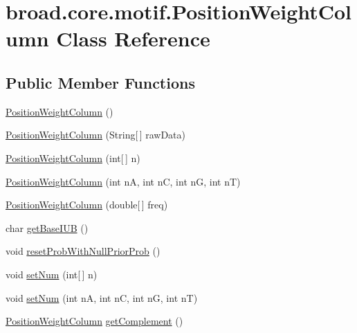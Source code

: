 \hypertarget{classbroad_1_1core_1_1motif_1_1_position_weight_column}{\section{broad.\+core.\+motif.\+Position\+Weight\+Column Class Reference}
\label{classbroad_1_1core_1_1motif_1_1_position_weight_column}
}
\subsection*{Public Member Functions}
\begin{DoxyCompactItemize}
\item 
\hyperlink{classbroad_1_1core_1_1motif_1_1_position_weight_column_a3f6de7b7a5d85e2e35becc1ade7b4549}{Position\+Weight\+Column} ()
\item 
\hyperlink{classbroad_1_1core_1_1motif_1_1_position_weight_column_a9cdd51008dd45f606b1467484c0b21a7}{Position\+Weight\+Column} (String\mbox{[}$\,$\mbox{]} raw\+Data)
\item 
\hyperlink{classbroad_1_1core_1_1motif_1_1_position_weight_column_ae18f2a79348c2617a646dccfcc75b994}{Position\+Weight\+Column} (int\mbox{[}$\,$\mbox{]} n)
\item 
\hyperlink{classbroad_1_1core_1_1motif_1_1_position_weight_column_a5baf30adf4feb6bc792f5e3a3f07a453}{Position\+Weight\+Column} (int n\+A, int n\+C, int n\+G, int n\+T)
\item 
\hyperlink{classbroad_1_1core_1_1motif_1_1_position_weight_column_a9378785c367ea7045b53febac477df5b}{Position\+Weight\+Column} (double\mbox{[}$\,$\mbox{]} freq)
\item 
char \hyperlink{classbroad_1_1core_1_1motif_1_1_position_weight_column_a82b21c847d46a9ad142aace82bc115d2}{get\+Base\+I\+U\+B} ()
\item 
void \hyperlink{classbroad_1_1core_1_1motif_1_1_position_weight_column_a51ef60325e0fb8d1b2487cc9a6741748}{reset\+Prob\+With\+Null\+Prior\+Prob} ()
\item 
void \hyperlink{classbroad_1_1core_1_1motif_1_1_position_weight_column_a6a093c62c5e480fdb2896978d4fb97cd}{set\+Num} (int\mbox{[}$\,$\mbox{]} n)
\item 
void \hyperlink{classbroad_1_1core_1_1motif_1_1_position_weight_column_a8643e8c7c0bc412bf6c8f7690931115c}{set\+Num} (int n\+A, int n\+C, int n\+G, int n\+T)
\item 
\hyperlink{classbroad_1_1core_1_1motif_1_1_position_weight_column}{Position\+Weight\+Column} \hyperlink{classbroad_1_1core_1_1motif_1_1_position_weight_column_a3b8fc8d22e61e6e7d681c7e200dc4e5d}{get\+Complement} ()

\end{DoxyCompactItemize}
